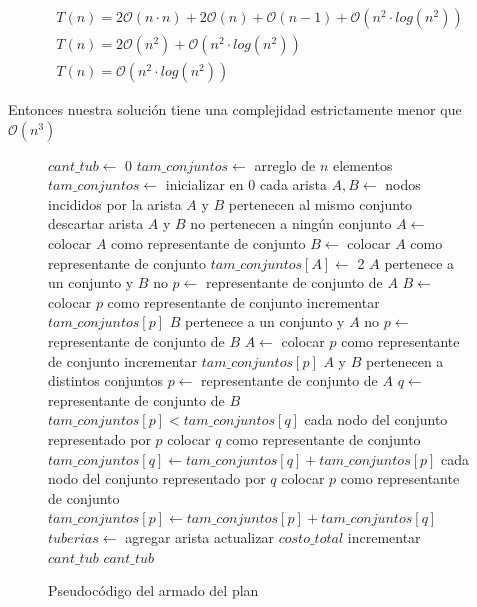 \begin{equation*}
\begin{array}{l}
T(n) = 2\mathcal{O}(n \cdot n) + 2\mathcal{O}(n) + \mathcal{O}(n-1) + \mathcal{O}(n^2 \cdot log(n^2))\\
T(n) = 2\mathcal{O}(n^2) + \mathcal{O}(n^2 \cdot log(n^2))\\
T(n) = \mathcal{O}(n^2 \cdot log(n^2))
\end{array}
\end{equation*}

Entonces nuestra solución tiene una complejidad estrictamente menor que $\mathcal{O}(n^3)$

\begin{figure}[!ht]
\begin{codebox}
\li $cant\_tub \leftarrow$ 0
\li $tam\_conjuntos \leftarrow$ arreglo de $n$ elementos
\li $tam\_conjuntos \leftarrow$ inicializar en 0
\li \For cada arista
\li 	\Do 
		$A,B \leftarrow$ nodos incididos por la arista
\li 		\If $A$ y $B$ pertenecen al mismo conjunto
\li 		\Then descartar arista
\li 		\Else
\li			\If $A$ y $B$ no pertenecen a ningún conjunto
\li 			\Then 
				$A \leftarrow$ colocar $A$ como representante de conjunto
\li 				$B \leftarrow$ colocar $A$ como representante de conjunto
\li 				$tam\_conjuntos[A] \leftarrow$ 2
\li			\Else \If $A$ pertenece a un conjunto y $B$ no
\li 				\Then 
					$p \leftarrow$ representante de conjunto de $A$
\li 					$B \leftarrow$ colocar $p$ como representante de conjunto
\li	 				incrementar $tam\_conjuntos[p]$
				\End
\li 			\Else \If $B$ pertenece a un conjunto y $A$ no
\li 				\Then 
					$p \leftarrow$ representante de conjunto de $B$
\li 					$A \leftarrow$ colocar $p$ como representante de conjunto
\li 					incrementar $tam\_conjuntos[p]$
				\End
\li 			\Else \If $A$ y $B$ pertenecen a distintos conjuntos
\li 				\Then
					$p \leftarrow$ representante de conjunto de $A$
\li 					$q \leftarrow$ representante de conjunto de $B$
\li 					\If $tam\_conjuntos[p] < tam\_conjuntos[q]$
\li 					\Then
						\For cada nodo del conjunto representado por $p$
\li 						\Do colocar $q$ como representante de conjunto
						\End
\li 						$tam\_conjuntos[q] \leftarrow tam\_conjuntos[q] + tam\_conjuntos[p]$
\li					\Else 
\li 						\For cada nodo del conjunto representado por $q$
\li						\Do colocar $p$ como representante de conjunto
						\End
\li 						$tam\_conjuntos[p] \leftarrow tam\_conjuntos[p] + tam\_conjuntos[q]$
					\End
				\End
			\End
\li 			$tuberias \leftarrow$ agregar arista
\li 			actualizar $costo\_total$
\li 			incrementar $cant\_tub$
		\End
	\End
\li \Return $cant\_tub$
\end{codebox} 
\caption{Pseudocódigo del armado del plan}\label{code:petroleo.plan}
\end{figure}

